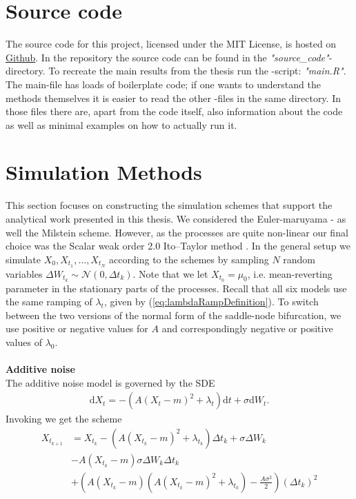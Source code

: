 \section{Source code}
The source code for this project, licensed under the MIT License, is hosted on \href{https://github.com/Gantzhorn/Thesis}{Github}. In the repository the source code can be found in the \textit{"source\_code"}-directory. To recreate the main results from the thesis run the -script: \textit{"main.R"}. The main-file has loads of boilerplate code; if one wants to understand the methods themselves it is easier to read the other -files in the same directory. In those files there are, apart from the code itself, also information about the code as well as minimal examples on how to actually run it. 
\section{Simulation Methods}\label{appendix:simMethods}
This section focuses on constructing the simulation schemes that support the analytical work presented in this thesis. We considered the Euler-maruyama - as well the Milstein scheme. However, as the processes are quite non-linear our final choice was the Scalar weak order 2.0 Ito–Taylor method \cite[algorithm 8.5]{Srkk2019}. In the general setup we simulate $X_0,X_{t_1},\dots, X_{t_N}$ according to the schemes by sampling $N$ random variables $\Delta W_{t_k}\sim\mathcal{N}\left(0, \Delta t_k\right)$. Note that we let $X_{t_0} = \mu_0$, i.e. mean-reverting parameter in the stationary parts of the processes. Recall that all six models use the same ramping of $\lambda_t$, given by (\ref{eq:lambdaRampDefinition}). To switch between the two versions of the normal form of the saddle-node bifurcation, we use positive or negative values for $A$ and correspondingly negative or positive values of $\lambda_0$. \\\\
\noindent \textbf{Additive noise}\\
The additive noise model is governed by the SDE
\begin{align}
    \mathrm{d}X_t = -\left(A(X_t - m)^2 + \lambda_t\right)\mathrm{d}t + \sigma \mathrm{d}W_t.
\end{align}
Invoking \cite[algorithm 8.5]{Srkk2019} we get the scheme
\begin{align}
    X_{t_{k + 1}} &= X_{t_k} - \left(A(X_{t_k} - m)^2 + \lambda_{t_k}\right) \Delta t_k + \sigma \Delta W_{k} \nonumber \\&-  A \left(X_{t_k} - m\right)\sigma \Delta W_k \Delta t_k\nonumber \\
    & + \left(A\left(X_{t_k} - m\right)\left(A\left(X_{t_k} - m\right)^2 + \lambda_{t_k}\right) - \frac{A \sigma^2}{2}\right)\left(\Delta t_k\right)^2 \label{eq:OUSim}
\end{align}

